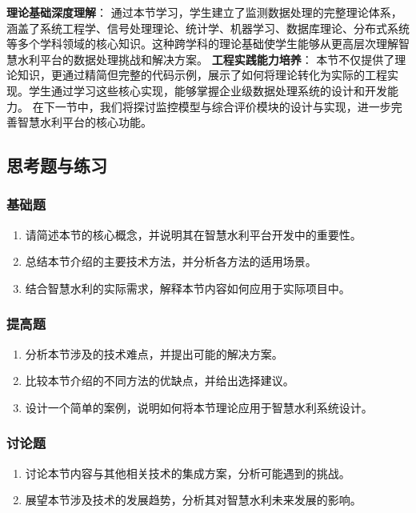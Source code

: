\textbf{理论基础深度理解}：
通过本节学习，学生建立了监测数据处理的完整理论体系，涵盖了系统工程学、信号处理理论、统计学、机器学习、数据库理论、分布式系统等多个学科领域的核心知识。这种跨学科的理论基础使学生能够从更高层次理解智慧水利平台的数据处理挑战和解决方案。
\textbf{工程实践能力培养}： 本节不仅提供了理论知识，更通过精简但完整的代码示例，展示了如何将理论转化为实际的工程实现。学生通过学习这些核心实现，能够掌握企业级数据处理系统的设计和开发能力。
在下一节中，我们将探讨监控模型与综合评价模块的设计与实现，进一步完善智慧水利平台的核心功能。 \subsection{思考题与练习}\label{ux601dux8003ux9898ux4e0eux7ec3ux4e60-1}
\subsubsection{基础题}\label{ux57faux7840ux9898-1} \begin{enumerate} \def\labelenumi{\arabic{enumi}.} \tightlist \item
请简述本节的核心概念，并说明其在智慧水利平台开发中的重要性。 \item 总结本节介绍的主要技术方法，并分析各方法的适用场景。 \item 结合智慧水利的实际需求，解释本节内容如何应用于实际项目中。 \end{enumerate}
\subsubsection{提高题}\label{ux63d0ux9ad8ux9898-1} \begin{enumerate} \def\labelenumi{\arabic{enumi}.} \tightlist \item
分析本节涉及的技术难点，并提出可能的解决方案。 \item 比较本节介绍的不同方法的优缺点，并给出选择建议。 \item 设计一个简单的案例，说明如何将本节理论应用于智慧水利系统设计。 \end{enumerate}
\subsubsection{讨论题}\label{ux8ba8ux8bbaux9898-1} \begin{enumerate} \def\labelenumi{\arabic{enumi}.} \tightlist \item
讨论本节内容与其他相关技术的集成方案，分析可能遇到的挑战。 \item 展望本节涉及技术的发展趋势，分析其对智慧水利未来发展的影响。 \end{enumerate}
